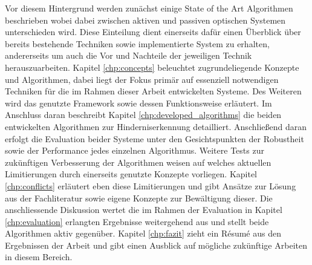 \noindent
Vor diesem Hintergrund werden zunächst einige State of the Art Algorithmen beschrieben wobei dabei zwischen aktiven und passiven optischen Systemen unterschieden wird. Diese Einteilung dient einerseits dafür einen Überblick über bereits bestehende Techniken sowie implementierte System zu erhalten, andererseits um auch die Vor und Nachteile der jeweiligen Technik herauszuarbeiten. Kapitel \ref{chp:concepts} beleuchtet zugrundeliegende Konzepte und Algorithmen, dabei liegt der Fokus primär auf essenziell notwendigen Techniken für die im Rahmen dieser Arbeit entwickelten Systeme. Des Weiteren wird das genutzte Framework sowie dessen Funktionsweise erläutert. Im Anschluss daran beschreibt Kapitel \ref{chp:developed_algorithms} die beiden entwickelten Algorithmen zur Hinderniserkennung detailliert. Anschließend daran erfolgt die Evaluation beider Systeme unter den Gesichtspunkten der Robustheit sowie der Performance jedes einzelnen Algorithmus. Weitere Tests zur zukünftigen Verbesserung der Algorithmen weisen auf welches aktuellen Limitierungen durch einerseits genutzte Konzepte vorliegen. Kapitel \ref{chp:conflicts} erläutert eben diese Limitierungen und gibt Ansätze zur Lösung aus der Fachliteratur sowie eigene Konzepte zur Bewältigung dieser. Die anschliessende Diskussion wertet die im Rahmen der Evaluation in Kapitel \ref{chp:evaluation} erlangten Ergebnisse weitergehend aus und stellt beide Algorithmen aktiv gegenüber. Kapitel \ref{chp:fazit} zieht ein Ré­su­mé aus den Ergebnissen der Arbeit und gibt einen Ausblick auf mögliche zukünftige Arbeiten in diesem Bereich.